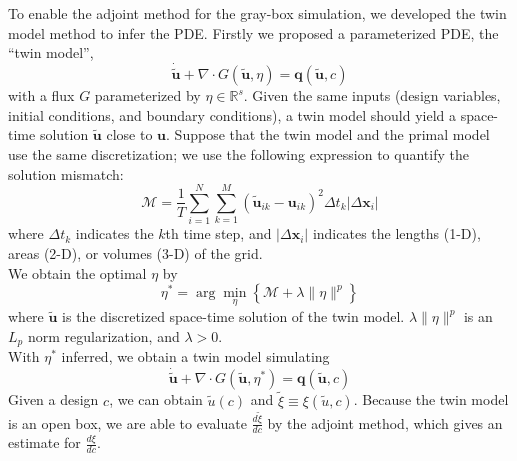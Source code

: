 \documentclass[a4paper,onecolumn]{article}
\theoremstyle{remark}
\begin{document}
\indent To enable the adjoint method for the gray-box simulation, we 
developed the twin model method to infer the PDE.
Firstly we proposed a parameterized PDE, the ``twin model'',
\begin{equation}
    \dot{ \tilde{\boldsymbol{u}}} + \nabla \cdot
    G(\tilde{\boldsymbol{u}}, \eta)
    = \boldsymbol{q}(\tilde{\boldsymbol{u}},c)
    \label{first equation 2}
\end{equation}
with a flux $G$ parameterized by $\eta \in\mathbb{R}^s$.
Given the same inputs (design variables, initial conditions, and boundary conditions), 
a twin model should yield a space-time solution $\tilde{\boldsymbol{u}}$ 
close to $\boldsymbol{u}$. 
Suppose that the twin model and the 
primal model use the same discretization; we use the following expression to quantify
the solution mismatch:
\begin{equation}
    \mathcal{M} = \frac{1}{T}
    \sum_{i=1}^{N}\sum_{k=1}^{M} \left(\tilde{\boldsymbol{u}}_{ik} 
    - \boldsymbol{u}_{ik}\right)^2 \Delta t_k
    \left| \Delta \mathbf{x}_i \right|
    \label{minimizer twin model discrete}
\end{equation}
where $\Delta t_k$ indicates the $k$th time step, and
$\left| \Delta \mathbf{x}_i \right|$ indicates the lengths (1-D), areas (2-D), or volumes (3-D) 
of the grid.\\

We obtain the optimal $\eta$ by
\begin{equation}
    \eta^* = 
    \arg\min_{\eta} \left\{
    \mathcal{M}
    + \lambda \|\eta\|^p  \right\}
    \label{objective twin model}
\end{equation}
where $\tilde{\boldsymbol{u}}$
is the discretized space-time solution of the twin model.
 $\lambda\|\eta\|^p$
is an $L_p$ norm regularization, and $\lambda>0$.\\

\indent With $\eta^*$ inferred, we obtain a twin model simulating
\begin{equation}
    \dot{ \tilde{\boldsymbol{u}}} + \nabla \cdot
    G(\tilde{\boldsymbol{u}}, \eta^*)
    = \boldsymbol{q}(\tilde{\boldsymbol{u}},c)
    \label{first equation 2}
\end{equation}
Given a design $c$, we can obtain $\tilde{u}(c)$ and $\tilde{\xi}\equiv \xi(\tilde{u},c)$.
Because the twin model is an open box, we are able to evaluate 
$\frac{d \tilde{\xi}}{d c}$ by the adjoint method, which gives
an estimate for $\frac{d \xi}{d c}$.
\end{document}

